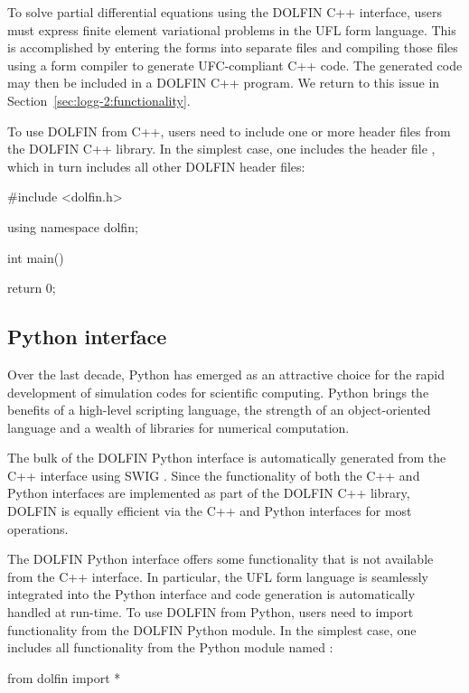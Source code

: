 To solve partial differential equations using the DOLFIN C++
interface, users must express finite element variational problems
in the UFL form language. This is accomplished by entering the forms
into separate  files and compiling those files using a form
compiler to generate UFC-compliant C++ code. The generated code may
then be included in a DOLFIN C++ program. We return to this issue in
Section~\ref{sec:logg-2:functionality}.

To use DOLFIN from C++, users need to include one or more header files
from the DOLFIN C++ library. In the simplest case, one includes the
header file , which in turn includes all other DOLFIN
header files:

\begin{c++}
#include <dolfin.h>

using namespace dolfin;

int main()
{

  return 0;
}
\end{c++}

\subsection{Python interface}

Over the last decade, Python has emerged as an attractive choice for
the rapid development of simulation codes for scientific computing.
Python brings the benefits of a high-level scripting language, the
strength of an object-oriented language and a wealth of libraries for
numerical computation.

The bulk of the DOLFIN Python interface is automatically generated
from the C++ interface using SWIG \citep{Beazley2006,www:swig}. Since
the functionality of both the C++ and Python interfaces are
implemented as part of the DOLFIN C++ library, DOLFIN is equally
efficient via the C++ and Python interfaces for most operations.

The DOLFIN Python interface offers some functionality that is not
available from the C++ interface. In particular, the UFL form language
is seamlessly integrated into the Python interface and code generation
is automatically handled at run-time.  To use DOLFIN from Python,
users need to import functionality from the DOLFIN Python module. In
the simplest case, one includes all functionality from the Python
module named :

\begin{python}
from dolfin import *
\end{python}

